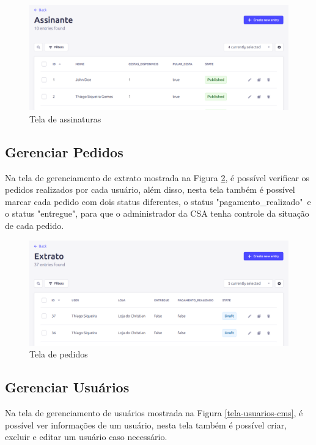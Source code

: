 \begin{figure}[h]
	\centering
	\includegraphics[keepaspectratio=true,scale=0.28]{figuras/painel_assinantes.png}
	\caption{Tela de assinaturas}
        \label{tela-assinaturas-cms}
\end{figure}

\subsection{Gerenciar Pedidos}
Na tela de gerenciamento de extrato mostrada na Figura \ref{tela-pedidos-cms}, é possível verificar os pedidos realizados por cada usuário, além disso, nesta tela também é possível marcar cada pedido com dois status diferentes, o status "pagamento\_realizado"\ e o status "entregue", para que o administrador da CSA tenha controle da situação de cada pedido.

\begin{figure}[h]
	\centering
	\includegraphics[keepaspectratio=true,scale=0.28]{figuras/painel_extrato.png}
	\caption{Tela de pedidos}
        \label{tela-pedidos-cms}
\end{figure}

\subsection{Gerenciar Usuários}
Na tela de gerenciamento de usuários mostrada na Figura \ref{tela-usuarios-cms}, é possível ver informações de um usuário, nesta tela também é possível criar, excluir e editar um usuário caso necessário.

